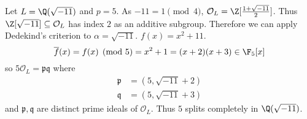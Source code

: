 \documentclass[a4paper]{article}
\renewcommand*{\O}{\mathcal{O}}
\newcommand*{\red}[1]{\overline{#1}} %
\begin{document}
\begin{eg}
  Let \(L = \Q(\sqrt{-11})\) and \(p = 5\). As \(-11 = 1 \pmod 4\), \(\O_L = \Z[\frac{1 + \sqrt{-11}}{2}]\). Thus \(\Z[\sqrt{-11}] \subseteq \O_L\) has index \(2\) as an additive subgroup. Therefore we can apply Dedekind's criterion to \(\alpha = \sqrt{-11}\). \(f(x) = x^2 + 11\).
  \[
    \red f(x) = f(x) \pmod 5 = x^2 + 1 = (x + 2)(x + 3) \in \F_5[x]
  \]
  so \(5\O_L = \mathfrak p \mathfrak q\) where
  \begin{align*}
    \mathfrak p &= (5, \sqrt{-11} + 2) \\
    \mathfrak q &= (5, \sqrt{-11} + 3)
  \end{align*}
  and \(\mathfrak p, \mathfrak q\) are distinct prime ideals of \(\O_L\). Thus \(5\) splits completely in \(\Q(\sqrt{-11})\).
\end{eg}
\end{document}
